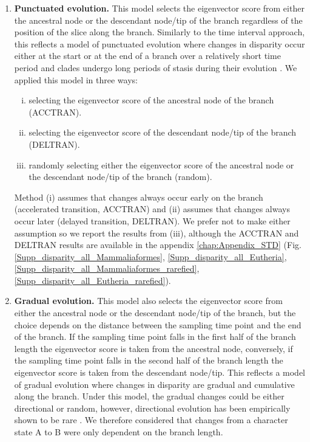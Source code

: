 \documentclass[12pt,a4paper]{article}
\begin{document}
\begin{enumerate}
    \item{\textbf{Punctuated evolution.}} 
    This model selects the eigenvector score from either the ancestral node or the descendant node/tip of the branch regardless of the position of the slice along the branch. 
    Similarly to the time interval approach, this reflects a model of punctuated evolution where changes in disparity occur either at the start or at the end of a branch over a relatively short time period and clades undergo long periods of stasis during their evolution \citep{Gould1977,Hunt20112007}.
    We applied this model in three ways: 
    \begin{enumerate}[(i)]
      \item selecting the eigenvector score of the ancestral node of the branch (ACCTRAN).
      \item selecting the eigenvector score of the descendant node/tip of the branch (DELTRAN).
      \item randomly selecting either the eigenvector score of the ancestral node or the descendant node/tip of the branch (random).
    \end{enumerate}
    Method (i) assumes that changes always occur early on the branch (accelerated transition, ACCTRAN) and (ii) assumes that changes always occur later (delayed transition, DELTRAN).
    We prefer not to make either assumption so we report the results from (iii), although the ACCTRAN and DELTRAN results are available in the appendix \ref{chap:Appendix_STD} (Fig. \ref{Supp_disparity_all_Mammaliaformes}, \ref{Supp_disparity_all_Eutheria}, \ref{Supp_disparity_all_Mammaliaformes_rarefied}, \ref{Supp_disparity_all_Eutheria_rarefied}).
    \item{\textbf{Gradual evolution.}}
    This model also selects the eigenvector score from either the ancestral node or the descendant node/tip of the branch, but the choice depends on the distance between the sampling time point and the end of the branch.
    If the sampling time point falls in the first half of the branch length the eigenvector score is taken from the ancestral node, conversely, if the sampling time point falls in the second half of the branch length the eigenvector score is taken from the descendant node/tip.
    This reflects a model of gradual evolution where changes in disparity are gradual and cumulative along the branch.
    Under this model, the gradual changes could be either directional or random, however, directional evolution has been empirically shown to be rare \citep[only 5\% of the time][]{Hunt20112007}.
    We therefore considered that changes from a character state A to B were only dependent on the branch length.
\end{enumerate}
\end{document}
